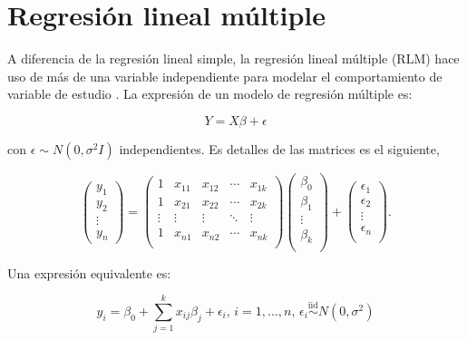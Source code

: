 \documentclass[
  11pt,
]{book}
\theoremstyle{definition}
\theoremstyle{definition}
\theoremstyle{definition}
\theoremstyle{definition}
\theoremstyle{remark}
\begin{document}
\section{Regresión lineal múltiple}\label{regresiuxf3n-lineal-muxfaltiple}

A diferencia de la regresión lineal simple, la regresión lineal múltiple (RLM) hace uso de más de una variable independiente para modelar el comportamiento de variable de estudio \citep[página 528]{Devore}. La expresión de un modelo de regresión múltiple es:

\begin{equation}
Y = X\beta + \epsilon
\label{eq:multiple1}
\end{equation}

con \(\epsilon \sim N(0,\sigma^2I)\) independientes. Es detalles de las matrices es el siguiente,

\begin{equation}
\begin{pmatrix}
y_1\\
y_2\\
\vdots\\
y_n
\end{pmatrix}
=
\begin{pmatrix}
1 & x_{11} & x_{12} & \cdots & x_{1k}\\
1 & x_{21} & x_{22} & \cdots & x_{2k}\\
\vdots & \vdots & \vdots & \ddots & \vdots \\
1 & x_{n1} & x_{n2} & \cdots & x_{nk}\\
\end{pmatrix} 
\begin{pmatrix}
\beta_0\\
\beta_1\\
\vdots \\
\beta_k\\
\end{pmatrix}
+
\begin{pmatrix}
\epsilon_1\\
\epsilon_2\\
\vdots \\
\epsilon_n\\
\end{pmatrix}.
\label{eq:multiple2}
\end{equation}

Una expresión equivalente es:

\begin{equation}
y_i = \beta_0 + \sum_{j=1}^k x_{ij}\beta_j +\epsilon_i\text{, } i = 1,\dots,n \text{, } \epsilon_i \overset{\text{iid}}{\sim} N(0,\sigma^2)
\label{eq:multiple3}
\end{equation}
\end{document}

